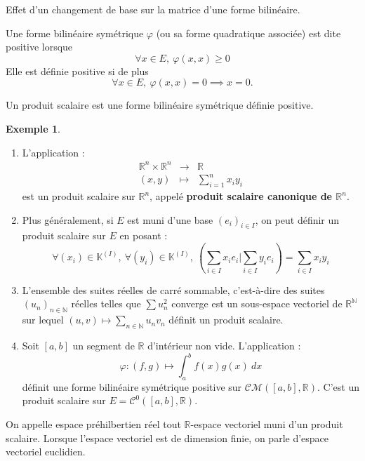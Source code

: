 \documentclass[french]{article}
\newcommand{\N}{\mathbb{N}}
\newcommand{\R}{\mathbb{R}}
\newcommand{\K}{\mathbb{K}}
\theoremstyle{plain}
\theoremstyle{definition}
\newtheorem*{ex}{Exemple}
\theoremstyle{remark}
\begin{document}
\begin{exo}
	Effet d'un changement de base sur la matrice d'une forme bilinéaire.
\end{exo}

\begin{dfn}
	Une forme bilinéaire symétrique $\varphi$ (ou sa forme quadratique associée) est dite positive lorsque $$\forall x\in E,\ \varphi(x,x)\geqslant 0$$ Elle est définie positive si de plus $$\forall x\in E,\ \varphi(x,x)=0\implies x=0.$$
\end{dfn}

\begin{dfn}
	Un produit scalaire est une forme bilinéaire symétrique définie positive.
\end{dfn}

\begin{ex}
	\begin{enumerate}
		\item L'application : $$\begin{array}{rcl}
			\R^n\times\R^n&\longrightarrow&\R \\
			(x,y)&\longmapsto&\sum_{i=1}^{n}x_iy_i
		\end{array}$$ est un produit scalaire sur $\R^n$, appelé \textbf{produit scalaire canonique de $\R^n$}.
		\item Plus généralement, si $E$ est muni d'une base $(e_i)_{i\in I}$, on peut définir un produit scalaire sur $E$ en posant : $$\forall (x_i)\in\K^{(I)},\ \forall (y_i)\in\K^{(I)},\ \left(\sum_{i\in I}x_ie_i\bigg| \sum_{i\in I} y_ie_i\right)=\sum_{i\in I}x_iy_i$$
		\item L'ensemble des suites réelles de carré sommable, c'est-à-dire des suites $(u_n)_{n\in\N}$ réelles telles que $\sum u_n^2$ converge est un sous-espace vectoriel de $\R^\N$ sur lequel $(u,v)\mapsto\displaystyle\sum_{n\in\N}u_nv_n$ définit un produit scalaire.
		\item Soit $[a,b]$ un segment de $\R$ d'intérieur non vide. L'application : $$\varphi:(f,g)\mapsto\int_{a}^{b}f(x)g(x)\ dx$$ définit une forme bilinéaire symétrique positive sur $\mathcal{CM}([a,b],\R)$. C'est un produit scalaire sur $E=\mathcal{C}^0([a,b],\R)$.
	\end{enumerate}
\end{ex}

\begin{dfn}
	On appelle espace préhilbertien réel tout $\R$-espace vectoriel muni d'un produit scalaire. Lorsque l'espace vectoriel est de dimension finie, on parle d'espace vectoriel euclidien.
\end{dfn}
\end{document}
